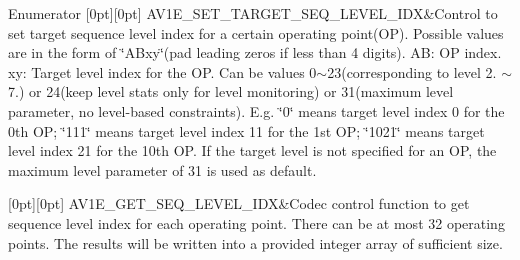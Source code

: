 \begin{DoxyEnumFields}{Enumerator}
[0pt][0pt]{}\mbox{\label{group__aom__encoder_ggae78dde67a6d78f332e9bdba0dde42db5abc032ee5a8dc3f51ab88b64737590f1b}} 
A\+V1\+E\+\_\+\+S\+E\+T\+\_\+\+T\+A\+R\+G\+E\+T\+\_\+\+S\+E\+Q\+\_\+\+L\+E\+V\+E\+L\+\_\+\+I\+DX&Control to set target sequence level index for a certain operating point(\+O\+P). Possible values are in the form of \char`\"{}\+A\+Bxy\char`\"{}(pad leading zeros if less than 4 digits). AB\+: OP index. xy\+: Target level index for the OP. Can be values 0$\sim$23(corresponding to level 2. $\sim$ 7.) or 24(keep level stats only for level monitoring) or 31(maximum level parameter, no level-\/based constraints). E.\+g. \char`\"{}0\char`\"{} means target level index 0 for the 0th OP; \char`\"{}111\char`\"{} means target level index 11 for the 1st OP; \char`\"{}1021\char`\"{} means target level index 21 for the 10th OP. If the target level is not specified for an OP, the maximum level parameter of 31 is used as default. \\
\hline

[0pt][0pt]{}\mbox{\label{group__aom__encoder_ggae78dde67a6d78f332e9bdba0dde42db5a726d36bbaf587cf30eb263e48a1c2e46}} 
A\+V1\+E\+\_\+\+G\+E\+T\+\_\+\+S\+E\+Q\+\_\+\+L\+E\+V\+E\+L\+\_\+\+I\+DX&Codec control function to get sequence level index for each operating point. There can be at most 32 operating points. The results will be written into a provided integer array of sufficient size. \\
\hline


\end{DoxyEnumFields}
